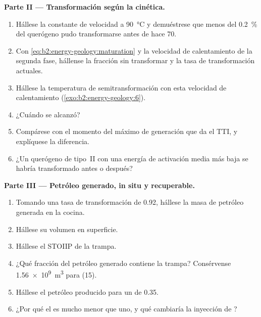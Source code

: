 \begin{problem}
\noindent\textbf{Parte II --- Transformación según la cinética.}
\begin{enumerate}[resume]
  \item Hállese la constante de velocidad a \qty{90}{\celsius} y demuéstrese que menos del \qty{0.2}{\percent} del
        querógeno pudo transformarse antes de hace \qty{70}{\Ma}.
  \item Con \eqref{eq:b2:energy-geology:maturation} y la velocidad de calentamiento de la segunda fase,
        hállense la fracción sin transformar y la tasa de transformación actuales.
  \item Hállese la temperatura de semitransformación con esta velocidad de calentamiento (\cref{exo:b2:energy-geology:6}).
  \item ¿Cuándo se alcanzó?
  \item Compárese con el momento del máximo de generación que da el TTI, y explíquese la diferencia.
  \item ¿Un querógeno de tipo~II con una energía de activación media más baja se habría transformado antes o después?
\end{enumerate}

\noindent\textbf{Parte III --- Petróleo generado, in situ y recuperable.}
\begin{enumerate}[resume]
  \item Tomando una tasa de transformación de 0.92, hállese la masa de petróleo generada en la cocina.
  \item Hállese su volumen en superficie.
  \item Hállese el STOIIP de la trampa.
  \item ¿Qué fracción del petróleo generado contiene la trampa? Consérvense \qty{1.56e9}{m^3} para (15).
  \item Hállese el petróleo producido para un  de 0.35.
  \item ¿Por qué el  es mucho menor que uno, y qué cambiaría la inyección de ?
\end{enumerate}


\end{problem}
